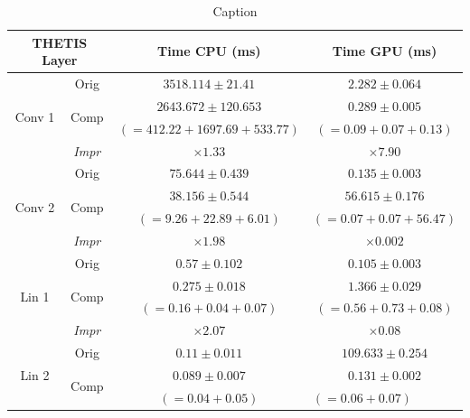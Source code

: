 \begin{table}
\small
\centering
\caption{Caption}
\label{tab:res_THETIS_timing}
\begin{tabular}{cc|cc}
\multicolumn{2}{c}{\textbf{THETIS Layer}}              & Time CPU (ms)                  & Time GPU (ms)                          \\ \hline
\multirow{4}{*}{Conv 1} & Orig                  & $3518.114\pm 21.41$        & $2.282\pm 0.064$                   \\
                        & \multirow{2}{*}{Comp} & $2643.672\pm 120.653$      & $0.289\pm 0.005$                   \\
                        &                       & $(=412.22+1697.69+533.77)$ & $(=0.09+0.07+0.13)$                \\
                        & \textit{Impr}         & $\times 1.33 $             & $\times 7.90 $                     \\ \hline
\multirow{4}{*}{Conv 2} & Orig                  & $75.644\pm 0.439$          & $0.135\pm 0.003$                   \\
                        & \multirow{2}{*}{Comp} & $38.156\pm 0.544$          & $56.615\pm 0.176$                  \\
                        &                       & $(=9.26+22.89+6.01)$       & $(=0.07+0.07+56.47)$               \\
                        & \textit{Impr}         & $ \times 1.98 $            & $\times 0.002 $                    \\ \hline
\multirow{4}{*}{Lin 1}  & Orig                  & $0.57\pm 0.102$            & $0.105\pm 0.003$                   \\
                        & \multirow{2}{*}{Comp} & $0.275\pm 0.018$           & $1.366\pm 0.029$                   \\
                        &                       & $(=0.16+0.04+0.07)$        & $(=0.56+0.73+0.08)$                \\
                        & \textit{Impr}         & $\times 2.07 $             & $\times 0.08$                      \\ \hline
\multirow{4}{*}{Lin 2}  & Orig                  & $0.11\pm 0.011$            & $109.633\pm 0.254$                 \\
                        & \multirow{2}{*}{Comp} & $0.089\pm 0.007$           & $0.131\pm 0.002$                   \\
                        &                       & $(=0.04+0.05)$             & \multicolumn{1}{l}{$(=0.06+0.07)$} \\

\end{tabular}
\end{table}
